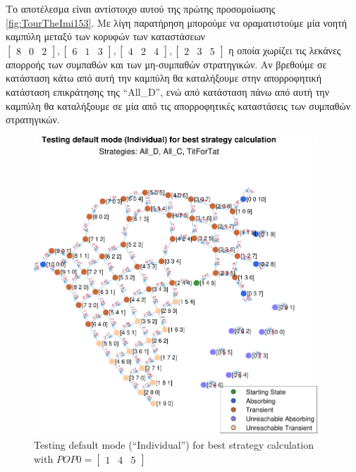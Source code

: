 \documentclass[12pt]{article}
\begin{document}
Το αποτέλεσμα είναι αντίστοιχο αυτού της πρώτης προσομοίωσης \ref{fig:TourTheImi153}. Με λίγη παρατήρηση μπορούμε να οραματιστούμε μία νοητή καμπύλη μεταξύ των κορυφών των καταστάσεων $\begin{bmatrix}8&0&2\end{bmatrix}, \begin{bmatrix}6&1&3\end{bmatrix}, \begin{bmatrix}4&2&4\end{bmatrix}, \begin{bmatrix}2&3&5\end{bmatrix}$ η οποία χωρίζει τις λεκάνες απορροής των συμπαθών και των μη-συμπαθών στρατηγικών. Αν βρεθούμε σε κατάσταση κάτω από αυτή την καμπύλη θα καταλήξουμε στην απορροφητική κατάσταση επικράτησης της ``All\_D'', ενώ από κατάσταση πάνω από αυτή την καμπύλη θα καταλήξουμε σε μία από τις απορροφητικές καταστάσεις των συμπαθών στρατηγικών.
	\begin{figure}[h]
	      \centering
	      \includegraphics[width=0.95\textwidth]{Testing default mode (Individual) for best strategy calculation.pdf}
	      \caption{Testing default mode (``Individual'') for best strategy calculation with $POP0=\begin{bmatrix}1&4&5\end{bmatrix}$}
	      \label{fig:TourTheImiIndividual}
	\end{figure}
\end{document}
